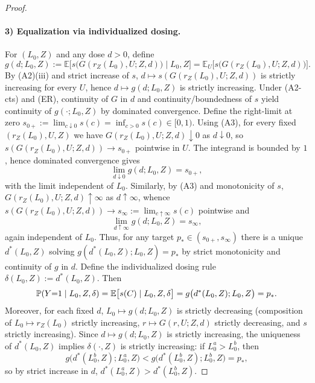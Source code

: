 \begin{proof}
\paragraph{3) Equalization via individualized dosing.}
For $(L_0, Z)$ and any dose $d > 0$, define
\[
 g(d; L_0, Z) := \mathbb E\big[s\big(G(r_Z(L_0), U; Z, d)\big) \mid L_0, Z\big] = \mathbb E_U\big[s\big(G(r_Z(L_0), U; Z, d)\big)\big].
\]
By (A2)(iii) and strict increase of $s$, $d \mapsto s(G(r_Z(L_0), U; Z, d))$ is strictly increasing for every $U$, hence $d \mapsto g(d; L_0, Z)$ is strictly increasing. Under (A2-cts) and (ER), continuity of $G$ in $d$ and continuity/boundedness of $s$ yield continuity of $g(\cdot; L_0, Z)$ by dominated convergence. Define the right-limit at zero $s_{0+} := \lim_{c\downarrow 0} s(c) = \inf_{c>0} s(c) \in [0,1)$. Using (A3), for every fixed $(r_Z(L_0), U, Z)$ we have $G(r_Z(L_0), U; Z, d) \downarrow 0$ as $d \downarrow 0$, so $s(G(r_Z(L_0), U; Z, d)) \to s_{0+}$ pointwise in $U$. The integrand is bounded by $1$, hence dominated convergence gives
\[
\lim_{d\downarrow 0} g(d; L_0, Z) = s_{0+},
\]
with the limit independent of $L_0$. Similarly, by (A3) and monotonicity of $s$, $G(r_Z(L_0), U; Z, d) \uparrow \infty$ as $d \uparrow \infty$, whence $s(G(r_Z(L_0), U; Z, d)) \to s_\infty := \lim_{c\uparrow \infty} s(c)$ pointwise and
\[
\lim_{d\uparrow \infty} g(d; L_0, Z) = s_\infty,
\]
again independent of $L_0$. Thus, for any target $p_* \in (s_{0+}, s_\infty)$ there is a unique $d^*(L_0, Z)$ solving $g(d^*(L_0, Z); L_0, Z) = p_*$ by strict monotonicity and continuity of $g$ in $d$. Define the individualized dosing rule $\delta(L_0, Z) := d^*(L_0, Z)$. Then
\[
\mathbb P(Y{=}1 \mid L_0, Z, \delta) = \mathbb E\big[s(C) \mid L_0, Z, \delta\big] = g\big(d^*(L_0, Z); L_0, Z\big) = p_* .\qedhere
\]
Moreover, for each fixed $d$, $L_0 \mapsto g(d; L_0, Z)$ is strictly decreasing (composition of $L_0 \mapsto r_Z(L_0)$ strictly increasing, $r \mapsto G(r, U; Z, d)$ strictly decreasing, and $s$ strictly increasing). Since $d \mapsto g(d; L_0, Z)$ is strictly increasing, the uniqueness of $d^*(L_0, Z)$ implies $\delta(\cdot, Z)$ is strictly increasing: if $L_0^a > L_0^b$, then
\[
 g\big(d^*(L_0^b, Z); L_0^a, Z\big) < g\big(d^*(L_0^b, Z); L_0^b, Z\big) = p_*,
\]
so by strict increase in $d$, $d^*(L_0^a, Z) > d^*(L_0^b, Z)$.
\end{proof}
